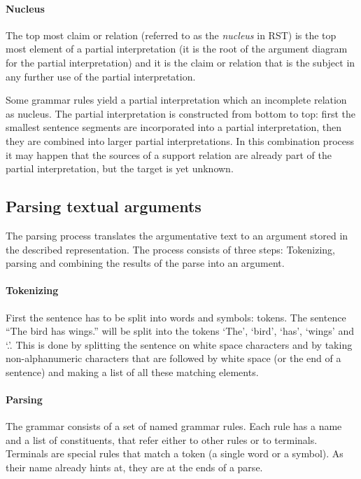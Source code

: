 \documentclass{IOS-Book-Article}
\begin{document}
\paragraph{Nucleus} The top most claim or relation (referred to as the \emph{nucleus} in RST) is the top most element of a partial interpretation (it is the root of the argument diagram for the partial interpretation) and it is the claim or relation that is the subject in any further use of the partial interpretation.

Some grammar rules yield a partial interpretation which an incomplete relation as nucleus. The partial interpretation is constructed from bottom to top: first the smallest sentence segments are incorporated into a partial interpretation, then they are combined into larger partial interpretations. In this combination process it may happen that the sources of a support relation are already part of the partial interpretation, but the target is yet unknown.

\subsection{Parsing textual arguments}
The parsing process translates the argumentative text to an argument stored in the described representation. The process consists of three steps: Tokenizing, parsing and combining the results of the parse into an argument.

\paragraph{Tokenizing} First the sentence has to be split into words and symbols: tokens. The sentence ``The bird has wings.'' will be split into the tokens `The', `bird', `has', `wings' and `.'. This is done by splitting the sentence on white space characters and by taking non-alphanumeric characters that are followed by white space (or the end of a sentence) and making a list of all these matching elements.

\paragraph{Parsing} The grammar consists of a set of named grammar rules. Each rule has a name and a list of constituents, that refer either to other rules or to terminals. Terminals are special rules that match a token (a single word or a symbol). As their name already hints at, they are at the ends of a parse.
\end{document}
